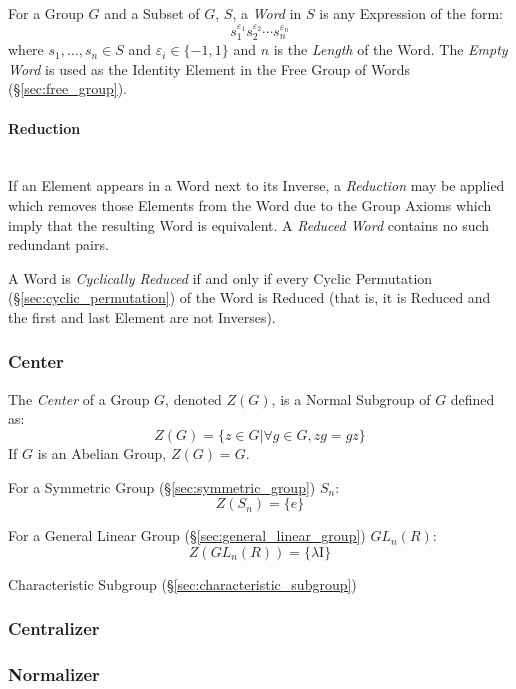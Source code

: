 For a Group $G$ and a Subset of $G$, $S$, a \emph{Word} in $S$ is any
Expression of the form:
\[
    s_1^{\varepsilon_1}s_2^{\varepsilon_2} \cdots s_n^{\varepsilon_n}
\]
where $s_1,\ldots,s_n \in S$ and $\varepsilon_i \in \{-1, 1\}$ and $n$
is the \emph{Length} of the Word. The \emph{Empty Word} is used as the
Identity Element in the Free Group of Words (\S\ref{sec:free_group}).



\paragraph{Reduction}\label{sec:word_reduction}
\hfill \\

If an Element appears in a Word next to its Inverse, a
\emph{Reduction} may be applied which removes those Elements from the
Word due to the Group Axioms which imply that the resulting Word is
equivalent. A \emph{Reduced Word} contains no such redundant pairs.

A Word is \emph{Cyclically Reduced} if and only if every Cyclic
Permutation (\S\ref{sec:cyclic_permutation}) of the Word is Reduced
(that is, it is Reduced and the first and last Element are not
Inverses).



\subsubsection{Center}\label{sec:group_center}

The \emph{Center} of a Group $G$, denoted $Z(G)$, is a Normal Subgroup
of $G$ defined as:
\[
    Z(G) = \{ z \in G | \forall g \in G, zg = gz \}
\]
If $G$ is an Abelian Group, $Z(G) = G$.

For a Symmetric Group (\S\ref{sec:symmetric_group}) $S_n$:
\[
    Z(S_n) = \{e\}
\]

For a General Linear Group (\S\ref{sec:general_linear_group})
$GL_n(R)$:
\[
    Z(GL_n(R)) = \{\lambda \mathrm{I}\}
\]

Characteristic Subgroup (\S\ref{sec:characteristic_subgroup})



\subsubsection{Centralizer}\label{sec:group_centralizer}

\subsubsection{Normalizer}\label{sec:group_normalizer}


